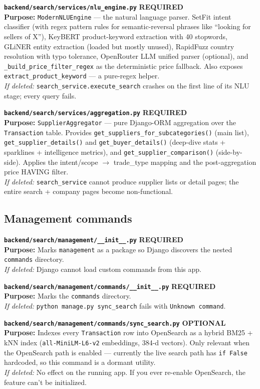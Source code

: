 \documentclass[10pt,a4paper]{article}
\newcommand{\reqBadge}{\textcolor{zarMidGreen}{\textbf{REQUIRED}}}
\newcommand{\optBadge}{\textcolor{zarAmber}{\textbf{OPTIONAL}}}
\newcommand{\fileEntry}[4]{%
  \par\noindent
  \begin{tcolorbox}[
    enhanced,
    breakable,
    colback=zarPaleGreen,
    colframe=zarMidGreen,
    arc=1pt,
    boxrule=0.4pt,
    left=6pt, right=6pt, top=3pt, bottom=3pt,
    fontupper=\small,
    before skip=2pt, after skip=4pt,
  ]
  \texttt{\textbf{#1}} \hfill {\small #2}\\[1pt]
  {\footnotesize\textbf{Purpose:} #3}\\[1pt]
  {\footnotesize\textit{If deleted:} #4}
  \end{tcolorbox}
}
\begin{document}
\fileEntry{backend/search/services/nlu\_engine.py}{\reqBadge}{\texttt{ModernNLUEngine} --- the natural language parser. SetFit intent classifier (with regex pattern rules for semantic-reversal phrases like ``looking for sellers of X''), KeyBERT product-keyword extraction with 40 stopwords, GLiNER entity extraction (loaded but mostly unused), RapidFuzz country resolution with typo tolerance, OpenRouter LLM unified parser (optional), and \texttt{\_build\_price\_filter\_regex} as the deterministic price fallback. Also exposes \texttt{extract\_product\_keyword} --- a pure-regex helper.}{\texttt{search\_service.execute\_search} crashes on the first line of its NLU stage; every query fails.}

\fileEntry{backend/search/services/aggregation.py}{\reqBadge}{\texttt{SupplierAggregator} --- pure Django-ORM aggregation over the \texttt{Transaction} table. Provides \texttt{get\_suppliers\_for\_subcategories()} (main list), \texttt{get\_supplier\_details()} and \texttt{get\_buyer\_details()} (deep-dive stats + sparklines + intelligence metrics), and \texttt{get\_supplier\_comparison()} (side-by-side). Applies the intent/scope $\rightarrow$ trade\_type mapping and the post-aggregation price HAVING filter.}{\texttt{search\_service} cannot produce supplier lists or detail pages; the entire search + company pages become non-functional.}

\subsection{Management commands}

\fileEntry{backend/search/management/\_\_init\_\_.py}{\reqBadge}{Marks \texttt{management} as a package so Django discovers the nested \texttt{commands} directory.}{Django cannot load custom commands from this app.}

\fileEntry{backend/search/management/commands/\_\_init\_\_.py}{\reqBadge}{Marks the \texttt{commands} directory.}{\texttt{python manage.py sync\_search} fails with \texttt{Unknown command}.}

\fileEntry{backend/search/management/commands/sync\_search.py}{\optBadge}{Indexes every \texttt{Transaction} row into OpenSearch as a hybrid BM25 + kNN index (\texttt{all-MiniLM-L6-v2} embeddings, 384-d vectors). Only relevant when the OpenSearch path is enabled --- currently the live search path has \texttt{if False} hardcoded, so this command is a dormant utility.}{No effect on the running app. If you ever re-enable OpenSearch, the feature can't be initialized.}
\end{document}

